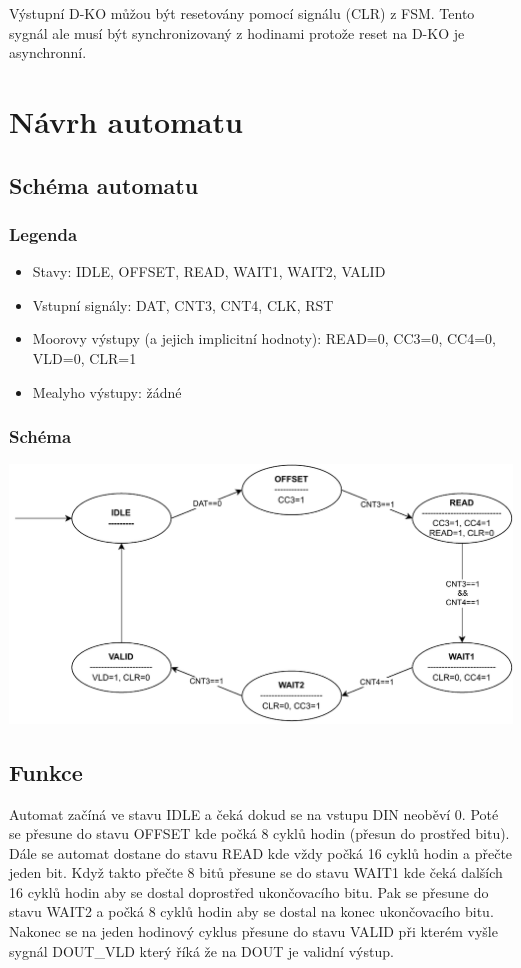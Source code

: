 \documentclass{article}
\begin{document}
Výstupní D-KO můžou být resetovány pomocí signálu (CLR) z FSM. Tento sygnál ale
musí být synchronizovaný z hodinami protože reset na D-KO je asynchronní.

\newpage

\section{Návrh automatu}

\subsection{Schéma automatu}

\subsubsection{Legenda}

\begin{itemize}
    \item Stavy: IDLE, OFFSET, READ, WAIT1, WAIT2, VALID
    \item Vstupní signály: DAT, CNT3, CNT4, CLK, RST
    \item Moorovy výstupy (a jejich implicitní hodnoty): READ=0, CC3=0, CC4=0,
          VLD=0, CLR=1
    \item Mealyho výstupy: žádné
\end{itemize}

\subsubsection{Schéma}

\includegraphics*[scale=0.9]{assets/FSM.pdf}

\subsection{Funkce}
Automat začíná ve stavu IDLE a čeká dokud se na vstupu DIN neoběví 0. Poté se
přesune do stavu OFFSET kde počká 8 cyklů hodin (přesun do prostřed bitu). Dále
se automat dostane do stavu READ kde vždy počká 16 cyklů hodin a přečte jeden
bit. Když takto přečte 8 bitů přesune se do stavu WAIT1 kde čeká dalších 16
cyklů hodin aby se dostal doprostřed ukončovacího bitu. Pak se přesune do stavu
WAIT2 a počká 8 cyklů hodin aby se dostal na konec ukončovacího bitu. Nakonec
se na jeden hodinový cyklus přesune do stavu VALID při kterém vyšle sygnál
DOUT\_VLD který říká že na DOUT je validní výstup.


%
%
\end{document}
